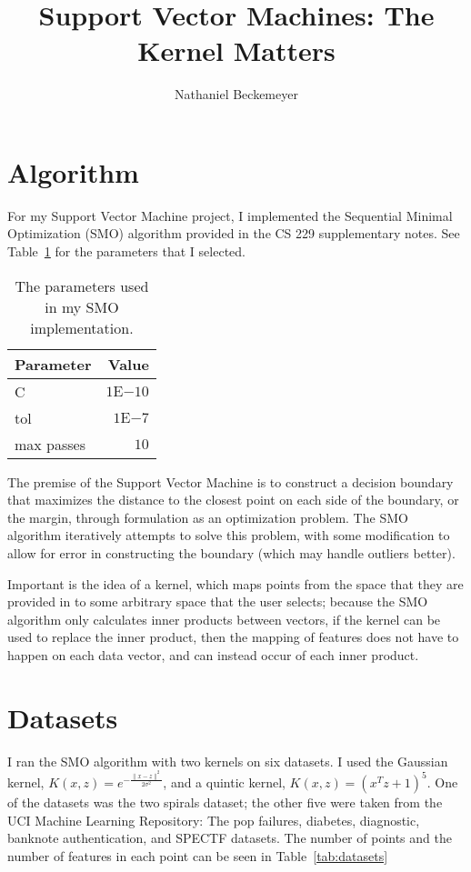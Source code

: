 \documentclass{journal}
\title{Support Vector Machines: The Kernel Matters}
\author{Nathaniel Beckemeyer}
\begin{document}
\maketitle{}

\section{Algorithm}
For my Support Vector Machine project, I implemented the Sequential
Minimal Optimization (SMO) algorithm provided
in the CS 229 supplementary notes. See Table~\ref{tab:smo_parameters} for the
parameters that I selected.

\begin{table}[h]
\centering{}
\caption{The parameters used in my SMO
implementation.}\label{tab:smo_parameters}
\begin{tabular}{lr}
    Parameter & Value \\ \toprule
    C & $1\mathrm{E}{-10}$ \\
    tol & $1\mathrm{E}{-7}$ \\
    max passes & $10$
\end{tabular}
\end{table}

The premise of the Support Vector Machine is to construct a decision boundary
that maximizes the distance to the closest point on each side of the boundary,
or the margin, through formulation as an optimization problem. The SMO algorithm
iteratively attempts to solve this problem, with some modification to allow for
error in constructing the boundary (which may handle outliers better).

Important is the idea of a kernel, which maps points from the space that
they are provided in to some arbitrary space that the user selects; because the
SMO algorithm only calculates inner products between vectors, if the kernel
can be used to replace the inner product, then the mapping of features does not
have to happen on each data vector, and can instead occur of each inner product.

\section{Datasets}
I ran the SMO algorithm with two kernels on six datasets. I used the Gaussian
kernel, $K(x, z) = e^{-\frac{\|x - z\|^2}{2\sigma{}^2}}$, and a quintic kernel,
$K(x, z) = (x^Tz + 1)^5$. One of the datasets was the two spirals dataset; the
other five were taken from the UCI Machine Learning Repository: The pop
failures, diabetes, diagnostic, banknote authentication, and SPECTF datasets.
The number of points and the number of features in each point can be seen in
Table~\ref{tab:datasets}
\end{document}
